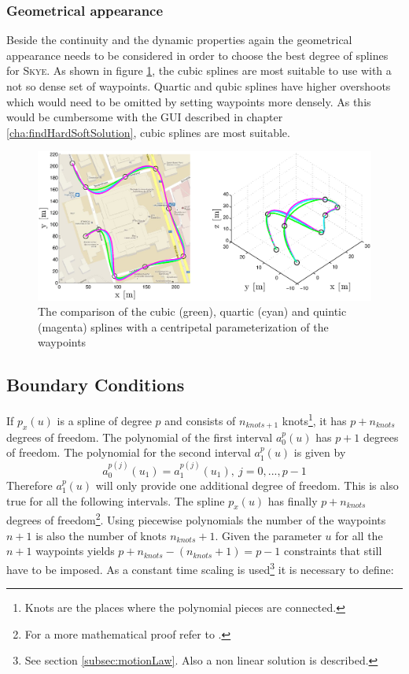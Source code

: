 \subsubsection{Geometrical appearance}
Beside the continuity and the dynamic properties again the geometrical appearance needs to be considered in order to choose the best degree of splines for \textsc{Skye}. As shown in figure \ref{fig:degreeCentripetal}, the cubic splines are most suitable to use with a not so dense set of waypoints. Quartic and qubic splines have higher overshoots which would need to be omitted by setting waypoints more densely. As this would be cumbersome with the GUI described in chapter \ref{cha:findHardSoftSolution}, cubic splines are most suitable. 

\begin{figure}[H]
	\centering
    \includegraphics[width = \textwidth]{graphics/DegreeCentripetal_road_agile.eps}
  \caption{The comparison of the cubic (green), quartic (cyan) and quintic (magenta) splines with a centripetal parameterization of the waypoints}
  \label{fig:degreeCentripetal}
\end{figure} 






\subsection{Boundary Conditions}
\label{subsec:boundary conditions}

If $p_x(u)$ is a spline of degree $p$ and consists of $n_{knots+1}$ knots\footnote{Knots are the places where the polynomial pieces are connected.}, it has $p+n_{knots}$ degrees of freedom. The polynomial of the first interval $a_0^p(u)$ has $p+1$ degrees of freedom. The polynomial for the second interval $a_1^p(u)$ is given by
\begin{equation*}
a_0^{p(j)}(u_1)=a_1^{p(j)}(u_1),~j=0,...,p-1
\end{equation*}
Therefore $a_1^p(u)$ will only provide one additional degree of freedom. This is also true for all the following intervals. The spline $p_x(u)$ has finally $p+n_{knots}$ degrees of freedom\footnote{For a more mathematical proof refer to \cite{dahmen}.}. Using piecewise polynomials the number of the waypoints $n+1$ is also the number of knots $n_{knots}+1$. Given the parameter $u$ for all the $n+1$ waypoints yields $p+n_{knots}-(n_{knots}+1) = p-1$ constraints that still have to be imposed. As a constant time scaling is used\footnote{ See section \ref{subsec:motionLaw}. Also a non linear solution is described.} it is necessary to define:

